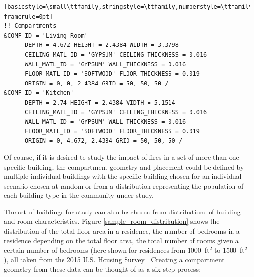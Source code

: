 \documentclass[12pt,twoside]{book}
\begin{document}
\begin{lstlisting}[basicstyle=\small\ttfamily,stringstyle=\ttfamily,numberstyle=\ttfamily,language=,frame=single, framerule=0pt]
!! Compartments
&COMP ID = 'Living Room'
      DEPTH = 4.672 HEIGHT = 2.4384 WIDTH = 3.3798
      CEILING_MATL_ID = 'GYPSUM' CEILING_THICKNESS = 0.016
      WALL_MATL_ID = 'GYPSUM' WALL_THICKNESS = 0.016
      FLOOR_MATL_ID = 'SOFTWOOD' FLOOR_THICKNESS = 0.019
      ORIGIN = 0, 0, 2.4384 GRID = 50, 50, 50 /
&COMP ID = 'Kitchen'
      DEPTH = 2.74 HEIGHT = 2.4384 WIDTH = 5.1514
      CEILING_MATL_ID = 'GYPSUM' CEILING_THICKNESS = 0.016
      WALL_MATL_ID = 'GYPSUM' WALL_THICKNESS = 0.016
      FLOOR_MATL_ID = 'SOFTWOOD' FLOOR_THICKNESS = 0.019
      ORIGIN = 0, 4.672, 2.4384 GRID = 50, 50, 50 /
\end{lstlisting}

Of course, if it is desired to study the impact of fires in a set of more than one specific building, the compartment geometry and placement could be defined by multiple individual buildings with the specific building chosen for an individual scenario chosen at random or from a distribution representing the population of each building type in the community under study.

The set of buildings for study can also be chosen from distributions of building and room characteristics. Figure \ref{sample_room_distribution} shows the distribution of the total floor area in a residence, the number of bedrooms in a residence depending on the total floor area, the total number of rooms given a certain number of bedrooms (here shown for residences from 1000~ft$^2$ to 1500~ft$^2$), all taken from the 2015 U.S. Housing Survey \cite{AHS2015}. Creating a compartment geometry from these data can be thought of as a six step process: 
\end{document}
